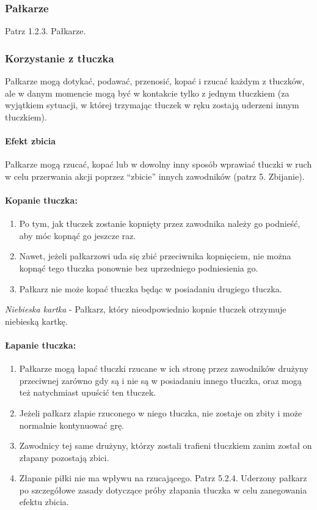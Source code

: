 \documentclass[12pt]{article}
\begin{document}
\subsubsection{Pałkarze}
Patrz 1.2.3. Pałkarze.

\subsubsection{Korzystanie z tłuczka}

Pałkarze mogą dotykać, podawać, przenosić, kopać i rzucać każdym z
tłuczków, ale w danym momencie mogą być w kontakcie tylko z jednym
tłuczkiem (za wyjątkiem sytuacji, w której trzymając tłuczek w ręku
zostają uderzeni innym tłuczkiem).

\paragraph{Efekt zbicia}
Pałkarze mogą rzucać, kopać lub w
dowolny inny sposób wprawiać tłuczki w ruch w celu przerwania akcji
poprzez ``zbicie'' innych zawodników (patrz 5. Zbijanie).

\paragraph{Kopanie tłuczka:}

\begin{enumerate}
	\item
	      Po tym, jak tłuczek zostanie kopnięty przez zawodnika należy go
	      podnieść, aby móc kopnąć go jeszcze raz.
	\item
	      Nawet, jeżeli pałkarzowi uda się zbić przeciwnika kopnięciem, nie
	      można kopnąć tego tłuczka ponownie bez uprzedniego podniesienia go.
	\item
	      Pałkarz nie może kopać tłuczka będąc w posiadaniu drugiego tłuczka.
\end{enumerate}

\emph{Niebieska kartka} - Pałkarz, który nieodpowiednio kopnie tłuczek
otrzymuje niebieską kartkę.

\paragraph{Łapanie tłuczka:}

\begin{enumerate}
	\item
	      Pałkarze mogą łapać tłuczki rzucane w ich stronę przez zawodników
	      drużyny przeciwnej zarówno gdy są i nie są w posiadaniu innego
	      tłuczka, oraz mogą też natychmiast upuścić ten tłuczek.
	\item
	      Jeżeli pałkarz złapie rzuconego w niego tłuczka, nie zostaje on zbity
	      i może normalnie kontynuować grę.
	\item
	      Zawodnicy tej same drużyny, którzy zostali trafieni tłuczkiem zanim
	      został on złapany pozostają zbici.
	\item
	      Złapanie piłki nie ma wpływu na rzucającego. Patrz 5.2.4. Uderzony
	      pałkarz po szczegółowe zasady dotyczące próby złapania tłuczka w celu
	      zanegowania efektu zbicia.
\end{enumerate}
\end{document}
